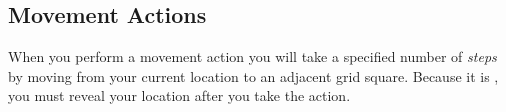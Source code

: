 \subsection*{Movement Actions}
When you perform a movement action you will take a specified number of \emph{steps} by moving from your current location to an adjacent grid square.  Because it is \LOUD{}, you must reveal your location after you take the \MMMOVE{} action.
